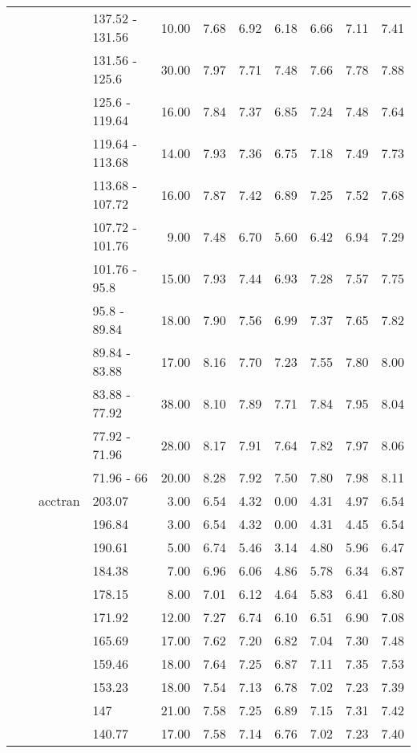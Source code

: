 \begin{longtable}{llllrrrrrrr}
   &  &  & 137.52 - 131.56 & 10.00 & 7.68 & 6.92 & 6.18 & 6.66 & 7.11 & 7.41 \\ 
   &  &  & 131.56 - 125.6 & 30.00 & 7.97 & 7.71 & 7.48 & 7.66 & 7.78 & 7.88 \\ 
   &  &  & 125.6 - 119.64 & 16.00 & 7.84 & 7.37 & 6.85 & 7.24 & 7.48 & 7.64 \\ 
   &  &  & 119.64 - 113.68 & 14.00 & 7.93 & 7.36 & 6.75 & 7.18 & 7.49 & 7.73 \\ 
   &  &  & 113.68 - 107.72 & 16.00 & 7.87 & 7.42 & 6.89 & 7.25 & 7.52 & 7.68 \\ 
   &  &  & 107.72 - 101.76 & 9.00 & 7.48 & 6.70 & 5.60 & 6.42 & 6.94 & 7.29 \\ 
   &  &  & 101.76 - 95.8 & 15.00 & 7.93 & 7.44 & 6.93 & 7.28 & 7.57 & 7.75 \\ 
   &  &  & 95.8 - 89.84 & 18.00 & 7.90 & 7.56 & 6.99 & 7.37 & 7.65 & 7.82 \\ 
   &  &  & 89.84 - 83.88 & 17.00 & 8.16 & 7.70 & 7.23 & 7.55 & 7.80 & 8.00 \\ 
   &  &  & 83.88 - 77.92 & 38.00 & 8.10 & 7.89 & 7.71 & 7.84 & 7.95 & 8.04 \\ 
   &  &  & 77.92 - 71.96 & 28.00 & 8.17 & 7.91 & 7.64 & 7.82 & 7.97 & 8.06 \\ 
   &  &  & 71.96 - 66 & 20.00 & 8.28 & 7.92 & 7.50 & 7.80 & 7.98 & 8.11 \\ 
   &  & acctran & 203.07 & 3.00 & 6.54 & 4.32 & 0.00 & 4.31 & 4.97 & 6.54 \\ 
   &  &  & 196.84 & 3.00 & 6.54 & 4.32 & 0.00 & 4.31 & 4.45 & 6.54 \\ 
   &  &  & 190.61 & 5.00 & 6.74 & 5.46 & 3.14 & 4.80 & 5.96 & 6.47 \\ 
   &  &  & 184.38 & 7.00 & 6.96 & 6.06 & 4.86 & 5.78 & 6.34 & 6.87 \\ 
   &  &  & 178.15 & 8.00 & 7.01 & 6.12 & 4.64 & 5.83 & 6.41 & 6.80 \\ 
   &  &  & 171.92 & 12.00 & 7.27 & 6.74 & 6.10 & 6.51 & 6.90 & 7.08 \\ 
   &  &  & 165.69 & 17.00 & 7.62 & 7.20 & 6.82 & 7.04 & 7.30 & 7.48 \\ 
   &  &  & 159.46 & 18.00 & 7.64 & 7.25 & 6.87 & 7.11 & 7.35 & 7.53 \\ 
   &  &  & 153.23 & 18.00 & 7.54 & 7.13 & 6.78 & 7.02 & 7.23 & 7.39 \\ 
   &  &  & 147 & 21.00 & 7.58 & 7.25 & 6.89 & 7.15 & 7.31 & 7.42 \\ 
   &  &  & 140.77 & 17.00 & 7.58 & 7.14 & 6.76 & 7.02 & 7.23 & 7.40 \\ 

\end{longtable}
